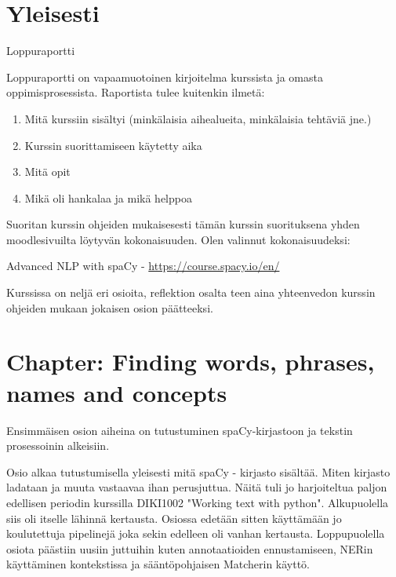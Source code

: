 \documentclass{article}
\begin{document}
\pagestyle{fancy}
\fancyhead{} %



 \section*{Yleisesti}

 Loppuraportti

Loppuraportti on vapaamuotoinen kirjoitelma kurssista ja omasta oppimisprosessista. Raportista tulee kuitenkin ilmetä:
\begin{enumerate}
    \item     Mitä kurssiin sisältyi (minkälaisia aihealueita, minkälaisia tehtäviä jne.)
    \item     Kurssin suorittamiseen käytetty aika 
    \item       Mitä opit
    \item     Mikä oli hankalaa ja mikä helppoa
\end{enumerate}

    Suoritan kurssin ohjeiden mukaisesesti tämän kurssin suorituksena yhden moodlesivuilta löytyvän kokonaisuuden. Olen valinnut kokonaisuudeksi: 

    Advanced NLP with spaCy - \url{https://course.spacy.io/en/}

    Kurssissa on neljä eri osioita, reflektion osalta teen aina yhteenvedon kurssin ohjeiden mukaan jokaisen osion päätteeksi.

\section{Chapter: Finding words, phrases, names and concepts}

Ensimmäisen osion aiheina on tutustuminen spaCy-kirjastoon ja tekstin prosessoinin alkeisiin.

Osio alkaa tutustumisella yleisesti mitä spaCy - kirjasto sisältää. Miten kirjasto ladataan ja muuta vastaavaa ihan perusjuttua. Näitä tuli jo harjoiteltua paljon edellisen periodin kurssilla 
DIKI1002 "Working text with python". Alkupuolella siis oli itselle lähinnä kertausta. Osiossa edetään sitten käyttämään jo koulutettuja pipelinejä joka sekin edelleen oli vanhan kertausta. Loppupuolella osiota päästiin uusiin juttuihin kuten annotaatioiden ennustamiseen, NERin käyttäminen kontekstissa ja sääntöpohjaisen Matcherin käyttö.
\end{document}
